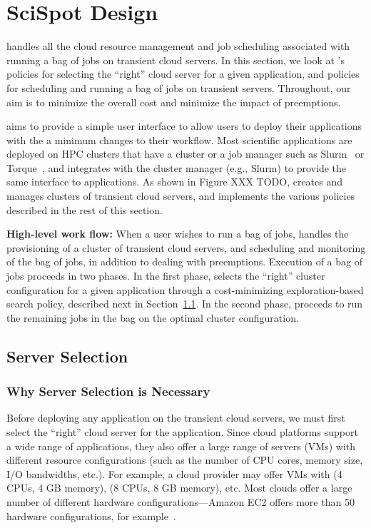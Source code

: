 \section{SciSpot Design}
\label{sec:design}

\sysname handles all the cloud resource management and job scheduling associated with running a bag of jobs on transient cloud servers. 
In this section, we look at \sysname's policies for selecting the ``right'' cloud server for a given application, and policies for scheduling and running a bag of jobs on transient servers.
Throughout, our aim is to minimize the overall cost and minimize the impact of preemptions. 


\sysname aims to provide a simple user interface to allow users to deploy their applications with the a minimum changes to their workflow.
Most scientific applications are deployed on HPC clusters that have a cluster or a job manager such as Slurm~\cite{slurm} or Torque~\cite{torque}, and \sysname integrates with the cluster manager (e.g., Slurm) to provide the same interface to applications.
As shown in Figure XXX TODO, \sysname creates and manages clusters of transient cloud servers, and implements the various policies described in the rest of this section. 


\noindent \textbf{High-level work flow:} When a user wishes to run a bag of jobs, \sysname handles the provisioning of a cluster of transient cloud servers, and scheduling and monitoring of the bag of jobs, in addition to dealing with preemptions.
Execution of a bag of jobs proceeds in two phases. In the first phase, \sysname selects the ``right'' cluster configuration for a given application through a cost-minimizing exploration-based search policy, described next in Section~\ref{subsec:server-selection}.
In the second phase, \sysname proceeds to run the remaining jobs in the bag on the optimal cluster configuration. 

\subsection{Server Selection}
\label{subsec:server-selection}

\subsubsection{Why Server Selection is Necessary}

Before deploying any application on the transient cloud servers, we must first select the ``right'' cloud server for the application. 
Since cloud platforms support a wide range of applications, they also offer a large range of servers (VMs) with different resource configurations (such as the number of CPU cores, memory size, I/O bandwidths, etc.). 
For example, a cloud provider may offer VMs with (4 CPUs, 4 GB memory), (8 CPUs, 8 GB memory), etc.
Most clouds offer a large number of different hardware configurations---Amazon EC2 offers more than 50 hardware configurations, for example~\cite{amazon-ec2-instance-types}. 

